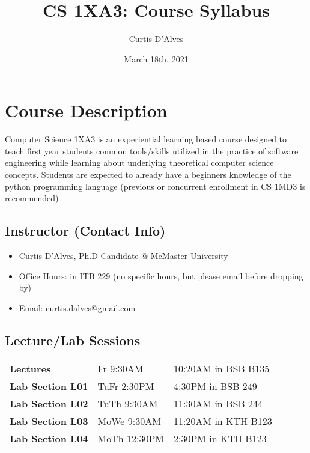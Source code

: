 \documentclass{article}
\author{Curtis D'Alves}
\date{March 18th, 2021}
\title{CS 1XA3: Course Syllabus}
\begin{document}
\maketitle

\section{Course Description}
\label{sec:org6645663}

Computer Science 1XA3 is an experiential learning based course designed to teach
first year students common tools/skills utilized in the practice of software
engineering while learning about underlying theoretical computer science
concepts. Students are expected to already have a beginners knowledge of the
python programming language (previous or concurrent enrollment in CS 1MD3 is
recommended)

\subsection{Instructor (Contact Info)}
\label{sec:orgf5b6043}
\begin{itemize}
\item Curtis D'Alves, Ph.D Candidate @ McMaster University
\item Office Hours: in ITB 229 (no specific hours, but please email before
dropping by)
\item Email: curtis.dalves@gmail.com
\end{itemize}

\subsection{Lecture/Lab Sessions}
\label{sec:orgadee886}

\begin{center}
\begin{tabular}{lll}
\textbf{Lectures} & Fr 9:30AM & 10:20AM in BSB B135\\
\textbf{Lab Section L01} & TuFr 2:30PM & 4:30PM in BSB 249\\
\textbf{Lab Section L02} & TuTh 9:30AM & 11:30AM in BSB 244\\
\textbf{Lab Section L03} & MoWe 9:30AM & 11:20AM in KTH B123\\
\textbf{Lab Section L04} & MoTh 12:30PM & 2:30PM in KTH B123\\
\end{tabular}
\end{center}
\end{document}
